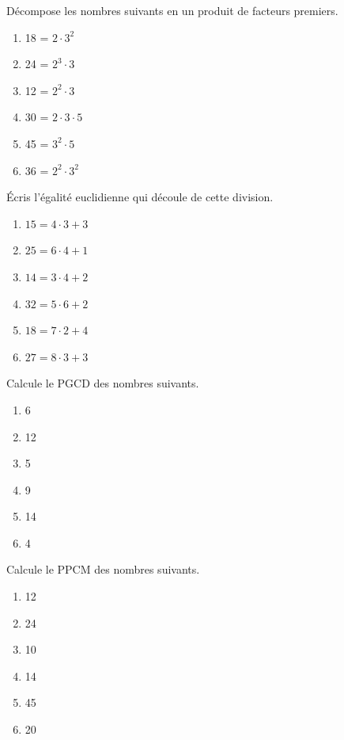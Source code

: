 \documentclass[12pt,parskip=half-, twoside=semi]{scrartcl}
\begin{document}
\setcounter{exercise}{0}


      \begin{exercise}
          Décompose les nombres suivants en un produit de facteurs premiers.

        \begin{enumerate}[cols=3]
          \item 18 = $2 \cdot 3^2$
          \item 24 = $2^3 \cdot 3$
          \item 12 = $2^2 \cdot 3$
          \item 30 = $2 \cdot 3 \cdot 5$
          \item 45 = $3^2 \cdot 5$
          \item 36 = $2^2 \cdot 3^2$
        \end{enumerate}
      \end{exercise}
      
      
      \begin{exercise}
        Écris l'égalité euclidienne qui découle de cette
      division.
          \begin{enumerate}[cols=3]
            \item $15 = 4 \cdot 3 + 3$
            \item $25 = 6 \cdot 4 + 1$
            \item $14 = 3 \cdot 4 + 2$
            \item $32 = 5 \cdot 6 + 2$
            \item $18 = 7 \cdot 2 + 4$
            \item $27 = 8 \cdot 3 + 3$
          \end{enumerate}
      \end{exercise}
      
      \begin{exercise}
        Calcule le PGCD des nombres suivants.
          \begin{enumerate}[cols=3]
              \item 6
              \item 12
              \item 5
              \item 9
              \item 14
              \item 4
          \end{enumerate}
      \end{exercise}
      
      \begin{exercise}
        Calcule le PPCM des nombres suivants.
          \begin{enumerate}[cols=3]
              \item 12
              \item 24
              \item 10
              \item 14
              \item 45
              \item 20
          \end{enumerate}
      \end{exercise}
      
\end{document}
